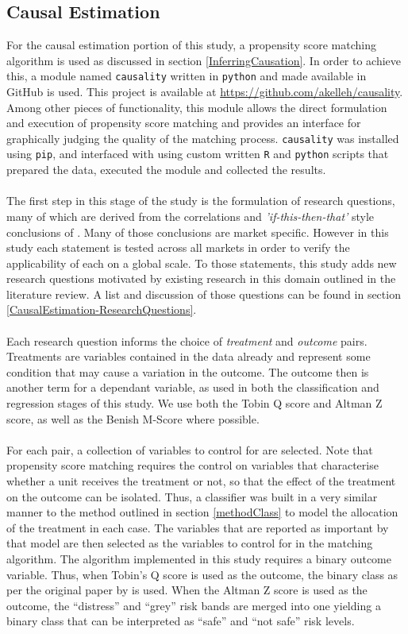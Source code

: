 {\subsection{Causal Estimation} \label{methodCausal}
{For the causal estimation portion of this study, a propensity score matching algorithm is used as discussed in section \ref{InferringCausation}. In order to achieve this, a module named {\texttt{causality}} written in {\texttt{python}} and made available in GitHub is used. This project is available at \url{https://github.com/akelleh/causality}. Among other pieces of functionality, this module allows the direct formulation and execution of propensity score matching and provides an interface for graphically judging the quality of the matching process. {\texttt{causality}} was installed using {\texttt{pip}}, and interfaced with using custom written {\texttt{R}} and {\texttt{python}} scripts that prepared the data, executed the module and collected the results.   \\\\
The first step in this stage of the study is the formulation of research questions, many of which are derived from the correlations and {\it 'if-this-then-that'} style conclusions of \cite{moldovan2015learning}. Many of those conclusions are market specific. However in this study each statement is tested across all markets in order to verify the applicability of each on a global scale. To those statements, this study adds new research questions motivated by existing research in this domain outlined in the literature review. A list and discussion of those questions can be found in section \ref{CausalEstimation-ResearchQuestions}.\\\\
Each research question informs the choice of {\it treatment} and {\it outcome} pairs. Treatments are variables contained in the data already and represent some condition that may cause a variation in the outcome. The outcome then is another term for a dependant variable, as used in both the classification and regression stages of this study. We use both the Tobin Q score and Altman Z score, as well as the Benish M-Score where possible.\\\\
For each pair, a collection of variables to control for are selected. Note that propensity score matching requires the control on variables that characterise whether a unit receives the treatment or not, so that the effect of the treatment on the outcome can be isolated. Thus, a classifier was built in a very similar manner to the method outlined in section \ref{methodClass} to model the allocation of the treatment in each case. The variables that are reported as important by that model are then selected as the variables to control for in the matching algorithm. The algorithm implemented in this study requires a binary outcome variable. Thus, when Tobin's Q score is used as the outcome, the binary class as per the original paper by \cite{moldovan2015learning} is used. When the Altman Z score is used as the outcome, the ``distress'' and ``grey'' risk bands are merged into one yielding a binary class that can be interpreted as ``safe'' and ``not safe'' risk levels.   }
}
